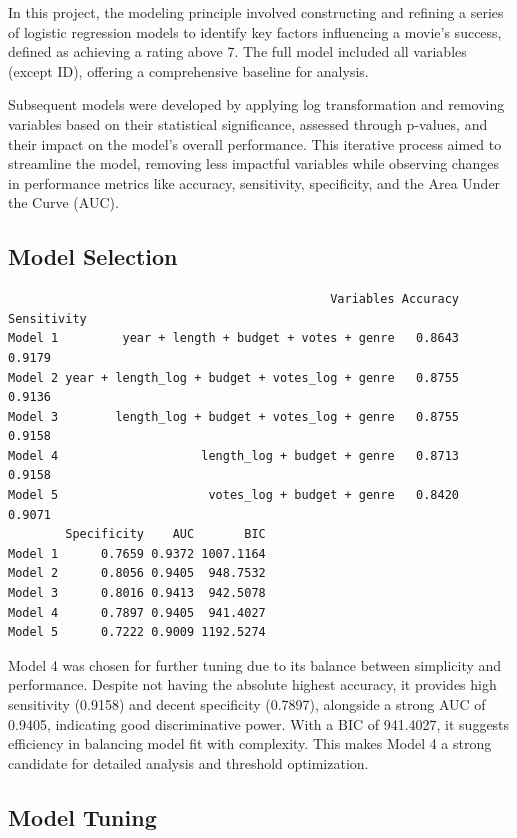 \documentclass[
  11pt,
]{article}
\begin{document}
In this project, the modeling principle involved constructing and
refining a series of logistic regression models to identify key factors
influencing a movie's success, defined as achieving a rating above 7.
The full model included all variables (except ID), offering a
comprehensive baseline for analysis.

Subsequent models were developed by applying log transformation and
removing variables based on their statistical significance, assessed
through p-values, and their impact on the model's overall performance.
This iterative process aimed to streamline the model, removing less
impactful variables while observing changes in performance metrics like
accuracy, sensitivity, specificity, and the Area Under the Curve (AUC).

\hypertarget{model-selection}{%
\subsection{Model Selection}\label{model-selection}}

\begin{verbatim}
                                             Variables Accuracy Sensitivity
Model 1         year + length + budget + votes + genre   0.8643      0.9179
Model 2 year + length_log + budget + votes_log + genre   0.8755      0.9136
Model 3        length_log + budget + votes_log + genre   0.8755      0.9158
Model 4                    length_log + budget + genre   0.8713      0.9158
Model 5                     votes_log + budget + genre   0.8420      0.9071
        Specificity    AUC       BIC
Model 1      0.7659 0.9372 1007.1164
Model 2      0.8056 0.9405  948.7532
Model 3      0.8016 0.9413  942.5078
Model 4      0.7897 0.9405  941.4027
Model 5      0.7222 0.9009 1192.5274
\end{verbatim}

Model 4 was chosen for further tuning due to its balance between
simplicity and performance. Despite not having the absolute highest
accuracy, it provides high sensitivity (0.9158) and decent specificity
(0.7897), alongside a strong AUC of 0.9405, indicating good
discriminative power. With a BIC of 941.4027, it suggests efficiency in
balancing model fit with complexity. This makes Model 4 a strong
candidate for detailed analysis and threshold optimization.

\hypertarget{model-tuning}{%
\subsection{Model Tuning}\label{model-tuning}}
\end{document}
